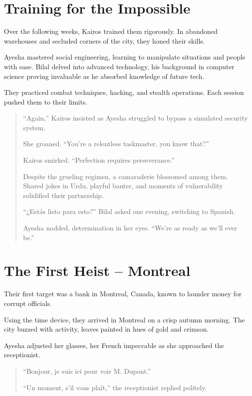 \documentclass[12pt]{book}
\begin{document}
\chapter{Training for the Impossible}

Over the following weeks, Kairos trained them rigorously. In abandoned warehouses and secluded corners of the city, they honed their skills.

Ayesha mastered social engineering, learning to manipulate situations and people with ease. Bilal delved into advanced technology, his background in computer science proving invaluable as he absorbed knowledge of future tech.

They practiced combat techniques, hacking, and stealth operations. Each session pushed them to their limits.

\begin{quote}
    ``Again,'' Kairos insisted as Ayesha struggled to bypass a simulated security system.

    She groaned. ``You're a relentless taskmaster, you know that?''

    Kairos smirked. ``Perfection requires perseverance.''

    Despite the grueling regimen, a camaraderie blossomed among them. Shared jokes in Urdu, playful banter, and moments of vulnerability solidified their partnership.

    ``¿Estás listo para esto?'' Bilal asked one evening, switching to Spanish.

    Ayesha nodded, determination in her eyes. ``We're as ready as we'll ever be.''
\end{quote}

\chapter{The First Heist – Montreal}

Their first target was a bank in Montreal, Canada, known to launder money for corrupt officials.

Using the time device, they arrived in Montreal on a crisp autumn morning. The city buzzed with activity, leaves painted in hues of gold and crimson.

Ayesha adjusted her glasses, her French impeccable as she approached the receptionist.

\begin{quote}
    ``Bonjour, je suis ici pour voir M. Dupont.''

    ``Un moment, s'il vous plaît,'' the receptionist replied politely.
\end{quote}
\end{document}
